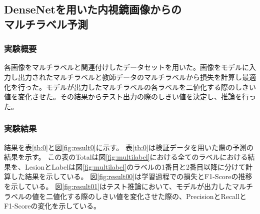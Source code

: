 \subsection{DenseNetを用いた内視鏡画像からの\\マルチラベル予測}
\subsubsection{実験概要}
各画像をマルチラベルと関連付けしたデータセットを用いた。画像をモデルに入力し出力されたマルチラベルと教師データのマルチラベルから損失を計算し最適化を行った。モデルが出力したマルチラベルの各ラベルを二値化する際のしきい値を変化させた。その結果からテスト出力の際のしきい値を決定し、推論を行った。

\subsubsection{実験結果}
結果を表\ref{tb:0}と図\ref{fig:result0}に示す。
表\ref{tb:0}は検証データを用いた際の予測の結果を示す。
この表のTotalは図\ref{fig:multilabel}における全てのラベルにおける結果を、LesionとLabelは図\ref{fig:multilabel}のラベルの1番目と2番目以降に分けて計算した結果を示している。
図\ref{fig:result00}は学習過程での損失とF1-Scoreの推移を示している。
図\ref{fig:result01}はテスト推論において、モデルが出力したマルチラベルの値を二値化する際のしきい値を変化させた際の、PrecisionとRecallとF1-Scoreの変化を示している。


